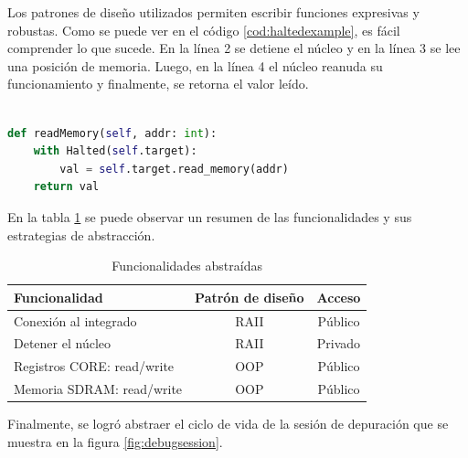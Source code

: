 Los patrones de diseño utilizados permiten escribir funciones expresivas y robustas.
Como se puede ver en el código \ref{cod:haltedexample}, es fácil comprender lo que sucede.
En la línea 2 se detiene el núcleo y en la línea 3 se lee una posición de memoria.
Luego, en la línea 4 el núcleo reanuda su funcionamiento y finalmente, se retorna el valor leído.

\newpage

\begin{lstlisting}[language=Python,label=cod:haltedexample,caption=Ejemplo de uso de \emph{RAII}.]  % Start your code-block

def readMemory(self, addr: int):
    with Halted(self.target):
        val = self.target.read_memory(addr)
    return val

\end{lstlisting}

En la tabla \ref{tab:funcionalidades} se puede observar un resumen de las funcionalidades y sus estrategias de abstracción.

\begin{table}[h]
	\centering
	\caption[Funcionalidades abstraidas]{Funcionalidades abstraídas}

	\begin{tabular}{l c c}    
		\toprule
        \textbf{Funcionalidad}     & \textbf{Patrón de diseño} & \textbf{Acceso}\\
		\midrule
		Conexión al integrado      & RAII                      & Público\\		
		Detener el núcleo          & RAII                      & Privado\\
		Registros CORE: read/write & OOP                       & Público\\
		Memoria SDRAM: read/write  & OOP                       & Público\\
		\bottomrule
		\hline
	\end{tabular}
	\label{tab:funcionalidades}
\end{table}

Finalmente, se logró abstraer el ciclo de vida de la sesión de depuración que se muestra en la figura \ref{fig:debugsession}.

